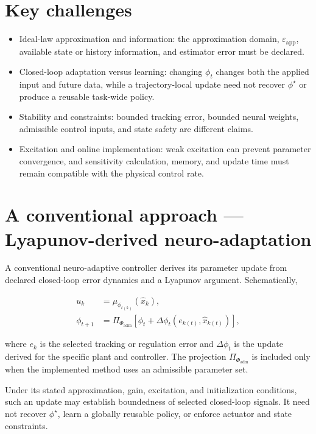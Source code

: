 \documentclass[a4paper]{article}
\begin{document}
\section{Key challenges}

\begin{itemize}
  \item Ideal-law approximation and information: the approximation domain, $\varepsilon_{\mathrm{app}}$, available state or history information, and estimator error must be declared.
  \item Closed-loop adaptation versus learning: changing $\phi_t$ changes both the applied input and future data, while a trajectory-local update need not recover $\phi^\star$ or produce a reusable task-wide policy.
  \item Stability and constraints: bounded tracking error, bounded neural weights, admissible control inputs, and state safety are different claims.
  \item Excitation and online implementation: weak excitation can prevent parameter convergence, and sensitivity calculation, memory, and update time must remain compatible with the physical control rate.
\end{itemize}

\section{A conventional approach — Lyapunov-derived neuro-adaptation}

A conventional neuro-adaptive controller derives its parameter update from declared closed-loop error dynamics and a Lyapunov argument. Schematically,

\begin{equation}
  \begin{aligned}
    u_k
    &=
    \mu_{\phi_{t(k)}}(\widehat x_k),\\
    \phi_{t+1}
    &=
    \Pi_{\Phi_{\mathrm{adm}}}
    \left[
    \phi_t+
    \Delta\phi_t
    \!\left(e_{k(t)},\widehat x_{k(t)}\right)
    \right],
  \end{aligned}
\end{equation}

where $e_k$ is the selected tracking or regulation error and $\Delta\phi_t$ is the update derived for the specific plant and controller. The projection $\Pi_{\Phi_{\mathrm{adm}}}$ is included only when the implemented method uses an admissible parameter set.

Under its stated approximation, gain, excitation, and initialization conditions, such an update may establish boundedness of selected closed-loop signals. It need not recover $\phi^\star$, learn a globally reusable policy, or enforce actuator and state constraints.
\end{document}
